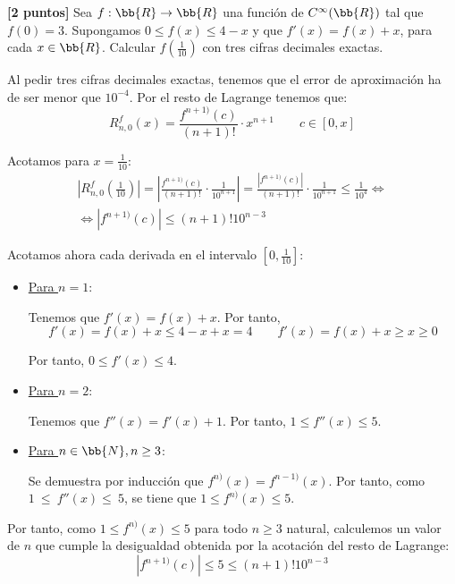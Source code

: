 \documentclass[12pt]{article}
\begin{document}
\begin{ejercicio}\textbf{[2 puntos]}
Sea $f:\bb{R}\to \bb{R}$  una función de $C^\infty(\bb{R})$ tal que $f(0)=3$. Supongamos $0\leq f(x)\leq 4-x$ y que $f'(x)=f(x)+x$, para cada $x\in \bb{R}$. Calcular $f\left(\frac{1}{10}\right)$ con tres cifras decimales exactas.

Al pedir tres cifras decimales exactas, tenemos que el error de aproximación ha de ser menor que $10^{-4}$. Por el resto de Lagrange tenemos que:
\begin{equation*}
    R_{n,0}^f(x)=\frac{f^{n+1)}(c)}{(n+1)!}\cdot x^{n+1} \qquad c\in [0,x]
\end{equation*}

Acotamos para $x=\frac{1}{10}$:
\begin{multline*}
    \left|R_{n,0}^f\left(\frac{1}{10}\right)\right|
    =\left|\frac{f^{n+1)}(c)}{(n+1)!}\cdot \frac{1}{10^{n+1}}\right|
    =\frac{\left|f^{n+1)}(c)\right|}{(n+1)!}\cdot \frac{1}{10^{n+1}} \leq \frac{1}{10^4}
    \Longleftrightarrow \\ \Longleftrightarrow 
    \left|f^{n+1)}(c)\right| \leq (n+1)!10^{n-3}
\end{multline*}

Acotamos ahora cada derivada en el intervalo $\left[0,\frac{1}{10}\right]$:
\begin{itemize}
    \item \underline{Para $n=1$}:

    Tenemos que $f'(x)=f(x)+x$. Por tanto,
    \begin{equation*}
        f'(x)=f(x)+x\leq 4-x+x=4
        \qquad
        f'(x)=f(x)+x\geq x \geq 0
    \end{equation*}

    Por tanto, $0\leq f'(x)\leq 4$.

    \item \underline{Para $n=2$}:

    Tenemos que $f''(x)=f'(x)+1$. Por tanto, $1\leq f''(x)\leq 5$.

    \item \underline{Para $n\in \bb{N}, n\geq 3$}:

    Se demuestra por inducción que $f^{n)}(x)=f^{n-1)}(x)$. Por tanto, como $1~\leq~f''(x)\leq~5$, se tiene que $1\leq f^{n)}(x)\leq 5$.
\end{itemize}

Por tanto, como $1\leq f^{n)}(x)\leq 5$ para todo $n\geq 3$ natural, calculemos un valor de $n$ que cumple la desigualdad obtenida por la acotación del resto de Lagrange:
\begin{equation*}
    \left|f^{n+1)}(c)\right| \leq 5 \leq (n+1)!10^{n-3}
\end{equation*}


\end{ejercicio}
\end{document}
